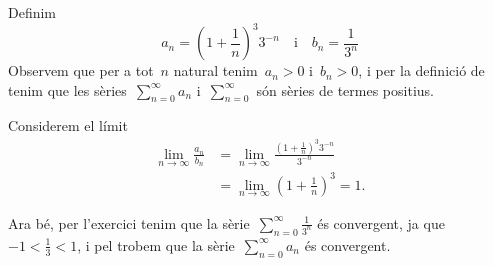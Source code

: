 \documentclass[../../main.tex]{subfiles}
\begin{document}
    \begin{solution}
        Definim
        \[
            a_{n}=\left(1+\frac{1}{n}\right)^{3}3^{-n}\quad\text{i}\quad b_{n}=\frac{1}{3^{n}}
        \]
        Observem que per a tot~\(n\) natural tenim~\(a_{n}>0\) i~\(b_{n}>0\), i per la definició de  tenim que les sèries~\(\sum_{n=0}^{\infty}a_{n}\) i~\(\sum_{n=0}^{\infty}\) són sèries de termes positius.

        Considerem el límit
        \begin{align*}
            \lim_{n\to\infty}\frac{a_{n}}{b_{n}}&=\lim_{n\to\infty}\frac{\left(1+\frac{1}{n}\right)^{3}3^{-n}}{3^{-n}}\\
            &=\lim_{n\to\infty}\left(1+\frac{1}{n}\right)^{3}=1.
        \end{align*}

        Ara bé, per l'exercici  tenim que la sèrie~\(\sum_{n=0}^{\infty}\frac{1}{3^{n}}\) és convergent, ja que~\(-1<\frac{1}{3}<1\), i pel  trobem que la sèrie~\(\sum_{n=0}^{\infty}a_{n}\) és convergent.
    \end{solution}
\end{document}
